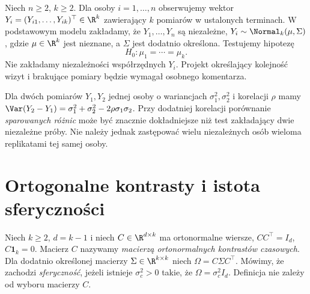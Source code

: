 \begin{definicja}\label{def:rm-model}
Niech $n\ge2$, $k\ge2$. Dla osoby $i=1,\ldots,n$ obserwujemy wektor $Y_i=(Y_{i1},\ldots,Y_{ik})^\top\in\R^k$ zawierający $k$ pomiarów w ustalonych terminach. W podstawowym modelu zakładamy, że $Y_1,\ldots,Y_n$ są niezależne, $Y_i\sim\Normal_k(\mu,\Sigma)$, gdzie $\mu\in\R^k$ jest nieznane, a $\Sigma$ jest dodatnio określona. Testujemy hipotezę
\[
 H_0:\mu_1=\cdots=\mu_k.
\]
Nie zakładamy niezależności współrzędnych $Y_i$. Projekt określający kolejność wizyt i brakujące pomiary będzie wymagał osobnego komentarza.
\end{definicja}

\begin{przyklad}
Dla dwóch pomiarów $Y_1,Y_2$ jednej osoby o wariancjach $\sigma_1^2,\sigma_2^2$ i korelacji $\rho$ mamy $\Var(Y_2-Y_1)=\sigma_1^2+\sigma_2^2-2\rho\sigma_1\sigma_2$. Przy dodatniej korelacji porównanie \emph{sparowanych różnic} może być znacznie dokładniejsze niż test zakładający dwie niezależne próby. Nie należy jednak zastępować wielu niezależnych osób wieloma replikatami tej samej osoby.
\end{przyklad}

\section{Ortogonalne kontrasty i istota sferyczności}
\begin{definicja}\label{def:sphericity}
Niech $k\ge2$, $d=k-1$ i niech $C\in\R^{d\times k}$ ma ortonormalne wiersze, $CC^\top=I_d$, $C\mathbf1_k=0$. Macierz $C$ nazywamy \emph{macierzą ortonormalnych kontrastów czasowych}. Dla dodatnio określonej macierzy $\Sigma\in\R^{k\times k}$ niech $\Omega=C\Sigma C^\top$. Mówimy, że zachodzi \emph{sferyczność}, jeżeli istnieje $\sigma_c^2>0$ takie, że $\Omega=\sigma_c^2 I_d$. Definicja nie zależy od wyboru macierzy $C$.
\end{definicja}

